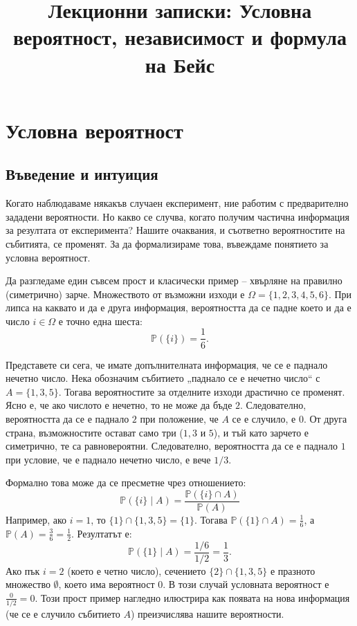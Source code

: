 \documentclass{article}
\begin{document}
\title{Лекционни записки: Условна вероятност, независимост и формула на Бейс}
\author{}
\date{}
\maketitle

\section{Условна вероятност}

\subsection{Въведение и интуиция}

Когато наблюдаваме някакъв случаен експеримент, ние работим с предварително зададени вероятности. Но какво се случва, когато получим частична информация за резултата от експеримента? Нашите очаквания, и съответно вероятностите на събитията, се променят. За да формализираме това, въвеждаме понятието за условна вероятност.

Да разгледаме един съвсем прост и класически пример – хвърляне на правилно (симетрично) зарче. Множеството от възможни изходи е $\Omega = \{1, 2, 3, 4, 5, 6\}$. При липса на каквато и да е друга информация, вероятността да се падне което и да е число $i \in \Omega$ е точно една шеста:
\[
\mathbb{P}(\{i\}) = \frac{1}{6}.
\]

Представете си сега, че имате допълнителната информация, че се е паднало нечетно число. Нека обозначим събитието „паднало се е нечетно число“ с $A = \{1, 3, 5\}$. Тогава вероятностите за отделните изходи драстично се променят. Ясно е, че ако числото е нечетно, то не може да бъде $2$. Следователно, вероятността да се е паднало $2$ при положение, че $A$ се е случило, е $0$. От друга страна, възможностите остават само три ($1, 3$ и $5$), и тъй като зарчето е симетрично, те са равновероятни. Следователно, вероятността да се е паднало $1$ при условие, че е паднало нечетно число, е вече $1/3$. 

Формално това може да се пресметне чрез отношението:
\[
\mathbb{P}(\{i\} \mid A) = \frac{\mathbb{P}(\{i\} \cap A)}{\mathbb{P}(A)}
\]
Например, ако $i = 1$, то $\{1\} \cap \{1, 3, 5\} = \{1\}$. Тогава $\mathbb{P}(\{1\} \cap A) = \frac{1}{6}$, а $\mathbb{P}(A) = \frac{3}{6} = \frac{1}{2}$. Резултатът е:
\[
\mathbb{P}(\{1\} \mid A) = \frac{1/6}{1/2} = \frac{1}{3}.
\]
Ако пък $i = 2$ (което е четно число), сечението $\{2\} \cap \{1, 3, 5\}$ е празното множество $\emptyset$, което има вероятност $0$. В този случай условната вероятност е $\frac{0}{1/2} = 0$. Този прост пример нагледно илюстрира как появата на нова информация (че се е случило събитието $A$) преизчислява нашите вероятности.
\end{document}
